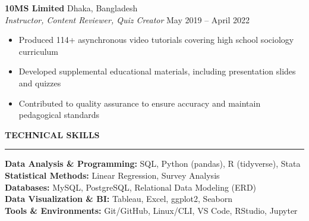 \documentclass[letterpaper, 11pt]{article}
\begin{document}

    \noindent \textbf{10MS Limited} \hfill Dhaka, Bangladesh \\
    \textit{Instructor, Content Reviewer, Quiz Creator} \hfill May 2019 -- April 2022
    \begin{itemize}[noitemsep, topsep=4pt, itemsep=2pt]
        \item Produced 114+ asynchronous video tutorials covering high school sociology curriculum
        \item Developed supplemental educational materials, including presentation slides and quizzes
        \item Contributed to quality assurance to ensure accuracy and maintain pedagogical standards
    \end{itemize}
    \vspace{0.5em}

    \noindent \textbf{\large TECHNICAL SKILLS}
    \vspace{0.3em}
    \hrule
    \vspace{0.5em}
    \noindent
    \textbf{Data Analysis \& Programming:} SQL, Python (pandas), R (tidyverse), Stata\\
    \textbf{Statistical Methods:} Linear Regression, Survey Analysis\\
    \textbf{Databases:} MySQL, PostgreSQL, Relational Data Modeling (ERD)\\
    \textbf{Data Visualization \& BI:} Tableau, Excel, ggplot2, Seaborn\\
    \textbf{Tools \& Environments:} Git/GitHub, Linux/CLI, VS Code, RStudio, Jupyter


    \vspace{0.5em}
\end{document}
